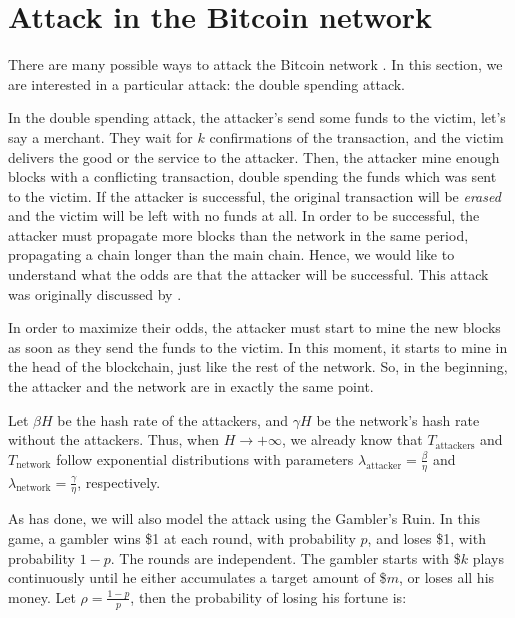 

\section{Attack in the Bitcoin network}

There are many possible ways to attack the Bitcoin network \citep{karame2012two, heilman2015eclipse, bahack2013theoretical, bonneau2016buy, neudecker2015simulation}. In this section, we are interested in a particular attack: the double spending attack.

In the double spending attack, the attacker's send some funds to the victim, let's say a merchant. They wait for $k$ confirmations of the transaction, and the victim delivers the good or the service to the attacker. Then, the attacker mine enough blocks with a conflicting transaction, double spending the funds which was sent to the victim. If the attacker is successful, the original transaction will be \textit{erased} and the victim will be left with no funds at all. In order to be successful, the attacker must propagate more blocks than the network in the same period, propagating a chain longer than the main chain. Hence, we would like to understand what the odds are that the attacker will be successful. This attack was originally discussed by \citet{nakamoto2008bitcoin}.

In order to maximize their odds, the attacker must start to mine the new blocks as soon as they send the funds to the victim. In this moment, it starts to mine in the head of the blockchain, just like the rest of the network. So, in the beginning, the attacker and the network are in exactly the same point.

Let $\beta H$ be the hash rate of the attackers, and $\gamma H$ be the network's hash rate without the attackers. Thus, when $H \rightarrow +\infty$, we already know that $T_{\text{attackers}}$ and $T_{\text{network}}$ follow exponential distributions with parameters $\lambda_{\text{attacker}} = \frac{\beta}{\eta}$ and $\lambda_{\text{network}} = \frac{\gamma}{\eta}$, respectively.

As \cite{nakamoto2008bitcoin} has done, we will also model the attack using the Gambler's Ruin. In this game, a gambler wins \$1 at each round, with probability $p$, and loses \$1, with probability $1-p$. The rounds are independent. The gambler starts with \$$k$ plays continuously until he either accumulates a target amount of \$$m$, or loses all his money. Let $\rho = \frac{1-p}{p}$, then the probability of losing his fortune is:

